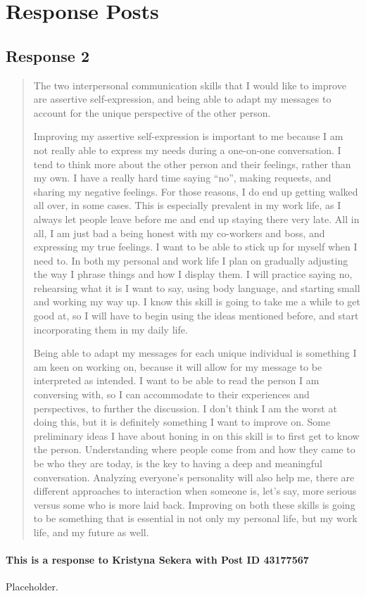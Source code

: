 
\section{Response Posts}
  \subsection{Response 2}
    \begin{quotation}
      The two interpersonal communication skills that I would like to improve
        are assertive self-expression, and being able to adapt my messages to
        account for the unique perspective of the other person.

      Improving my assertive self-expression is important to me because I am not
        really able to express my needs during a one-on-one conversation. I tend
        to think more about the other person and their feelings, rather than my
        own. I have a really hard time saying “no”, making requests, and sharing
        my negative feelings. For those reasons, I do end up getting walked all
        over, in some cases. This is especially prevalent in my work life, as I
        always let people leave before me and end up staying there very late.
        All in all, I am just bad a being honest with my co-workers and boss,
        and expressing my true feelings. I want to be able to stick up for
        myself when I need to. In both my personal and work life I plan on
        gradually adjusting the way I phrase things and how I display them. I
        will practice saying no, rehearsing what it is I want to say, using body
        language, and starting small and working my way up. I know this skill is
        going to take me a while to get good at, so I will have to begin using
        the ideas mentioned before, and start incorporating them in my daily
        life.

      Being able to adapt my messages for each unique individual is something I
        am keen on working on, because it will allow for my message to be
        interpreted as intended. I want to be able to read the person I am
        conversing with, so I can accommodate to their experiences and
        perspectives, to further the discussion. I don’t think I am the worst
        at doing this, but it is definitely something I want to improve on.
        Some preliminary ideas I have about honing in on this skill is to first
        get to know the person. Understanding where people come from and how
        they came to be who they are today, is the key to having a deep and
        meaningful conversation. Analyzing everyone’s personality will also
        help me, there are different approaches to interaction when someone is,
        let’s say, more serious versus some who is more laid back. Improving on
        both these skills is going to be something that is essential in not only
        my personal life, but my work life, and my future as well.
    \end{quotation}

    \paragraph{This is a response to Kristyna Sekera with Post ID 43177567}
    Placeholder.
